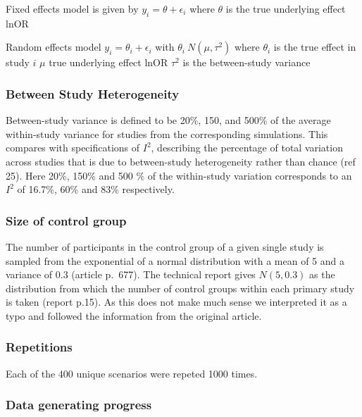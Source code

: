 \documentclass[
  english,
  doc,floatsintext,draftall]{apa6}
\begin{document}
Fixed effects model is given by
\(y_i=\theta + \epsilon_i\)
where \(\theta\) is the true underlying effect lnOR

Random effects model
\(y_i = \theta_i + \epsilon_i\)
with \(\theta_i~ N(\mu,\tau^2)\)
where \(\theta_i\) is the true effect in study \(i\)
\(\mu\) true underlying effect lnOR
\(\tau^2\) is the between-study variance

\hypertarget{between-study-heterogeneity}{%
\subsubsection{Between Study Heterogeneity}\label{between-study-heterogeneity}}

Between-study variance is defined to be 20\%, 150, and 500\% of the average within-study variance for studies from the corresponding simulations.
This compares with specifications of \(I^2\), describing the percentage of total variation across studies that is due to between-study heterogeneity rather than chance (ref 25). Here 20\%, 150\% and 500 \% of the within-study variation corresponds to an \(I^2\) of 16.7\%, 60\% and 83\% respectively.

\hypertarget{size-of-control-group}{%
\subsubsection{Size of control group}\label{size-of-control-group}}

The number of participants in the control group of a given single study is sampled from the exponential of a normal distribution with a mean of 5 and a variance of 0.3 (article p.~677).
The technical report gives \(N(5, 0.3)\) as the distribution from which the number of control groups within each primary study is taken (report p.15). As this does not make much sense we interpreted it as a typo and followed the information from the original article.

\hypertarget{repetitions}{%
\subsubsection{Repetitions}\label{repetitions}}

Each of the 400 unique scenarios were repeted 1000 times.

\hypertarget{data-generating-progress}{%
\subsubsection{Data generating progress}\label{data-generating-progress}}
\end{document}
